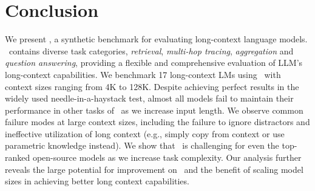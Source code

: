 \section{Conclusion}

We present , a synthetic benchmark for evaluating long-context language models.
~contains diverse task categories, \emph{retrieval}, \emph{multi-hop tracing}, \emph{aggregation} and \emph{question answering}, providing a flexible and comprehensive evaluation of LLM's long-context capabilities.
We benchmark 17 long-context LMs using ~with context sizes ranging from 4K to 128K. Despite achieving perfect results in the widely used needle-in-a-haystack test, almost all models fail to maintain their performance in other tasks of ~as we increase input length. We observe common failure modes at large context sizes, including the failure to ignore distractors and ineffective utilization of long context (e.g., simply copy from context or use parametric knowledge instead). We show that ~is challenging for even the top-ranked open-source models as we increase task complexity.  Our analysis further reveals the large potential for improvement on ~and the benefit of scaling model sizes in achieving better long context capabilities. 
